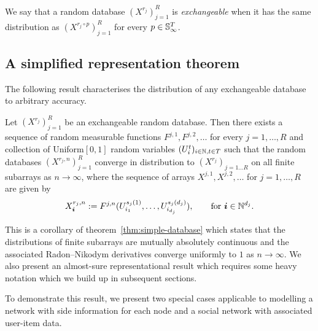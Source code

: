 \begin{definition}
We say that a random database $(X^{r_j})_{j=1}^R$ is \emph{exchangeable} when it has the same distribution as $(X^{r_j\circ p})_{j=1}^R$ for every $p \in \mathbb{S}_{\infty}^T$.
\end{definition}



\subsection{A simplified representation theorem}

The following result characterises the distribution of any exchangeable database to arbitrary accuracy.

\begin{cor}
  \label{cor:simple-database}
   Let $(X^{r_j})_{j=1}^R$ be an exchangeable random database.
   Then there exists a sequence of random measurable functions $F^{j,1}, F^{j,2}, \dotsc$ for 
   every $j=1,\ldots, R$ and collection of \iid Uniform$[0,1]$ random variables $(U^t_i)_{i\in\mathbb{N},t \in T}$ such that 
   the random databases $(X^{r_j,n})_{j=1}^R$
    converge in distribution to $(X^{r_j})_{j=1\ldots R}$ on all finite subarrays as $n\to \infty$, where   
   the sequence of arrays $X^{j,1},X^{j,2},\dotsc$ for $j = 1,\dotsc,R$ are given by
   \[
     X^{r_j,n}_{\bm{i}} := F^{j,n}(U^{s_j(1)}_{i_1},\dotsc,U^{s_j(d_j)}_{i_{d_j}}), \qquad \text{for } \bm{i} \in \mathbb{N}^{d_j}.
   \]
\end{cor}

This is a corollary of theorem~\ref{thm:simple-database} which states that the distributions of finite subarrays are mutually absolutely continuous and the associated Radon--Nikodym derivatives converge uniformly to $1$ as $n \to \infty$.
We also present an almost-sure representational result which requires some heavy notation which we build up in subsequent sections.

To demonstrate this result, we present two special cases applicable to modelling a network with side information for each node and a social network with associated user-item data.

